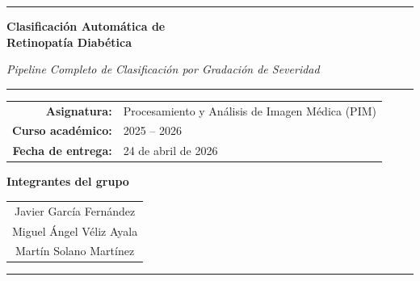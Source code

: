\documentclass[12pt, a4paper]{article}
\begin{document}

\begin{titlepage}
  \centering

  \begin{minipage}{\textwidth}
    \color{azuloscuro}\rule{\textwidth}{4pt}
  \end{minipage}

  \vspace{2.5cm}

  {\Huge\bfseries
    Clasificación Automática de\\[6pt]
    Retinopatía Diabética
  }

  \vspace{0.5cm}
  {\large\itshape
    Pipeline Completo de Clasificación por Gradación de Severidad
  }

  \vspace{0.4cm}
  \color{azulmedio}\rule{0.6\textwidth}{1.5pt}\color{black}

  \vspace{2cm}

  \begin{tabular}{rl}
    \textbf{Asignatura:}       & Procesamiento y Análisis de Imagen Médica (PIM) \\[4pt]
    \textbf{Curso académico:}  & 2025 -- 2026 \\[4pt]
    \textbf{Fecha de entrega:} & 24 de abril de 2026 \\
  \end{tabular}

  \vspace{2cm}

  {\large\bfseries Integrantes del grupo}\\[0.6cm]
  \begin{tabular}{c}
    Javier García Fernández    \\[4pt]
    Miguel Ángel Véliz Ayala  \\[4pt]
    Martín Solano Martínez     \\
  \end{tabular}

  \vfill

  \begin{minipage}{\textwidth}
    \color{azuloscuro}\rule{\textwidth}{4pt}
  \end{minipage}

\end{titlepage}
\end{document}
